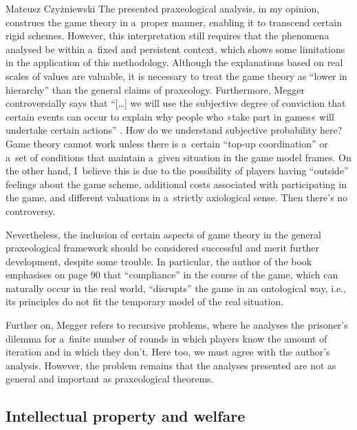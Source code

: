 \begin{newrevengenv}{Mateusz Czyżniewski}
The presented praxeological analysis, in my opinion, construes the game theory in a~proper manner, enabling it to transcend certain rigid schemes. However, this interpretation still requires that the phenomena analysed be within a~fixed and persistent context, which shows some limitations in the application of this methodology. Although the explanations based on real scales of values are valuable, it is necessary to treat the game theory as ``lower in hierarchy'' than the general claims of praxeology. Furthermore, Megger controversially says that ``[…] we will use the subjective degree of conviction that certain events can occur to explain why people who »take part in games« will undertake certain actions'' 
\parencite[][p.92]{megger_sprawiedliwosc_2021}. %
 How do we understand subjective probability here? Game theory cannot work unless there is a~certain ``top-up coordination'' or a~set of conditions that maintain a~given situation in the game model frames. On the other hand, I~believe this is due to the possibility of players having ``outside'' feelings about the game scheme, additional costs associated with participating in the game, and different valuations in a~strictly axiological sense. Then there's no controversy.



Nevertheless, the inclusion of certain aspects of game theory in the general praxeological framework should be considered successful and merit further development, despite some trouble. In particular, the author of the book emphasises on page 90 that ``compliance'' in the course of the game, which can naturally occur in the real world, ``disrupts'' the game in an ontological way, i.e., its principles do not fit the temporary model of the real situation.



Further on, Megger 
\parencite*[][pp.91–93]{megger_sprawiedliwosc_2021} %
 refers to recursive problems, where he analyses the prisoner's dilemma for a~finite number of rounds in which players know the amount of iteration and in which they don't. Here too, we must agree with the author's analysis. However, the problem remains that the analyses presented are not as general and important as praxeological theorems.



\subsection{Intellectual property and welfare}




\end{newrevengenv}
